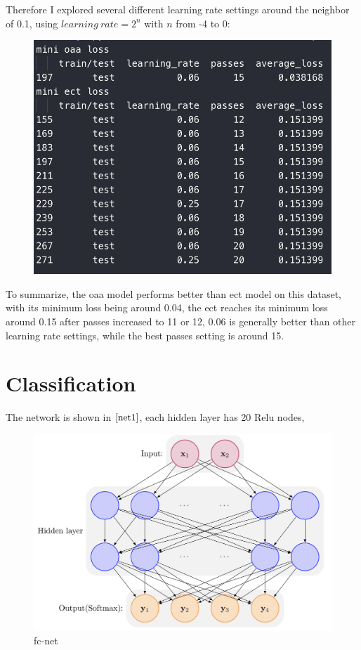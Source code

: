 \documentclass[a4paper,12pt]{article}
\begin{document}
Therefore I explored several different learning rate settings around the neighbor of 0.1, using $learning \ rate = 2^n$ with $n$ from -4 to 0:
\begin{figure}[htbp]
    \centering
    \includegraphics[width = .5\textwidth]{result}
\end{figure}
To summarize, the oaa model performs better than ect model on this dataset, with its minimum loss being around 0.04, the ect reaches its minimum loss around 0.15 after
passes increased to 11 or 12, 0.06 is generally better than other learning rate settings, while the best passes setting is around 15.



\section{Classification}

The network is shown in $\ref{net1}$, each hidden layer has 20 Relu nodes,
\begin{figure}[htbp]
    \centering
    \includegraphics[width = .65\textwidth]{net1}
    \caption{fc-net}
    \label{net1}
\end{figure} 
\end{document}
